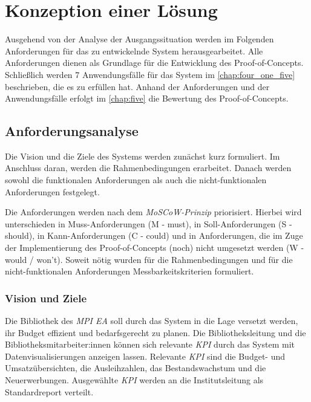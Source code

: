 \chapter{Konzeption einer Lösung}
\label{chap:four}
Ausgehend von der Analyse der Ausgangssituation werden im Folgenden 
Anforderungen für das zu entwickelnde System herausgearbeitet.
Alle Anforderungen dienen als Grundlage für die Entwicklung des Proof-of-Concepts. 
Schließlich werden 7 Anwendungsfälle für das System im \autoref{chap:four_one_five} beschrieben, die es zu erfüllen hat.
Anhand der Anforderungen und der Anwendungsfälle erfolgt im \autoref{chap:five} die Bewertung des Proof-of-Concepts.


\section{Anforderungsanalyse}
Die Vision und die Ziele des Systems werden zunächst kurz formuliert. Im Anschluss daran,
werden die Rahmenbedingungen erarbeitet. Danach werden sowohl die funktionalen Anforderungen als
auch die nicht-funktionalen Anforderungen festgelegt. 


Die Anforderungen werden nach dem \textit{MoSCoW-Prinzip} priorisiert. 
Hierbei wird unterschieden in Muss-Anforderungen (M - must), in Soll-Anforderungen (S - should), in Kann-Anforderungen (C - could) und in Anforderungen,
die im Zuge der Implementierung des Proof-of-Concepts (noch) nicht umgesetzt werden (W - would / won't).
Soweit nötig wurden für die Rahmenbedingungen und für die nicht-funktionalen Anforderungen Messbarkeitskriterien formuliert. 

\subsection{Vision und Ziele}
Die Bibliothek des \textit{\acrshort{MPI EA}} soll durch das System in die Lage versetzt werden, ihr Budget effizient und bedarfsgerecht zu planen.
Die Bibliotheksleitung und die Bibliotheksmitarbeiter:innen können sich relevante \textit{\acrlong{KPI}} durch das System mit
Datenvisualisierungen anzeigen lassen. Relevante \textit{\acrshort{KPI}} sind die Budget- und Umsatzübersichten, die Ausleihzahlen, das Bestandswachstum und die
Neuerwerbungen. 
Ausgewählte \textit{\acrshort{KPI}} werden an die Institutsleitung als Standardreport verteilt.

